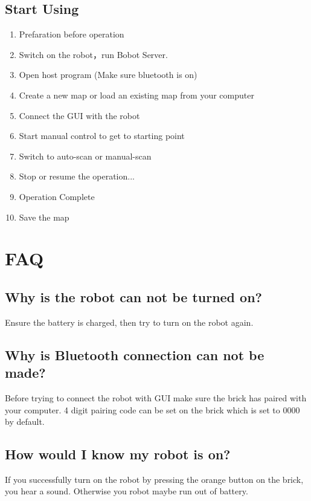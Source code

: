 \documentclass[11pt, a4paper]{report}
\begin{document}
\section{Start Using}
\begin{enumerate}

	\item Prefaration before operation
	\item Switch on the robot，run Bobot Server.
	\item Open host program (Make sure bluetooth is on)
	\item Create a new map or load an existing map from your computer
	\item Connect the GUI with the robot
	\item Start manual control to get to starting point
	\item Switch to auto-scan or manual-scan
	\item Stop or resume the operation...
	\item Operation Complete
	\item Save the map
\end{enumerate}



\pagebreak
 



\chapter{FAQ}

\section{Why is the robot can not be turned on?}
Ensure the battery is charged, then try to turn on the robot again.

\section{Why is Bluetooth connection can not be made?}
Before trying to connect the robot with GUI make sure the brick has paired with your computer. 4 digit pairing code can be set on the brick which is set to 0000 by default.

\section{How would I know my robot is on?}
If you successfully turn on the robot by pressing the orange button on the brick, you hear a sound. Otherwise you robot maybe run out of battery.
\end{document}
